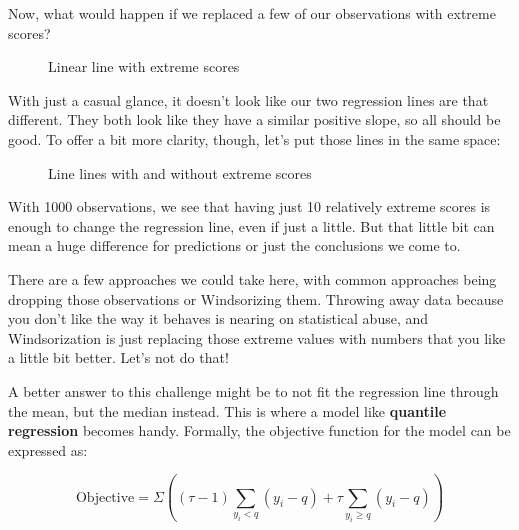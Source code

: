 \documentclass[
  letterpaper,
]{krantz}
\begin{document}
Now, what would happen if we replaced a few of our observations with
extreme scores?

\begin{figure}[H]


\caption{\label{fig-linear-line-extremes}Linear line with extreme
scores}

\end{figure}%

With just a casual glance, it doesn't look like our two regression lines
are that different. They both look like they have a similar positive
slope, so all should be good. To offer a bit more clarity, though, let's
put those lines in the same space:

\begin{figure}[H]


\caption{\label{fig-both-linear-lines}Line lines with and without
extreme scores}

\end{figure}%

With 1000 observations, we see that having just 10 relatively extreme
scores is enough to change the regression line, even if just a little.
But that little bit can mean a huge difference for predictions or just
the conclusions we come to.

There are a few approaches we could take here, with common approaches
being dropping those observations or Windsorizing them. Throwing away
data because you don't like the way it behaves is nearing on statistical
abuse, and Windsorization is just replacing those extreme values with
numbers that you like a little bit better. Let's not do that!

A better answer to this challenge might be to not fit the regression
line through the mean, but the median instead. This is where a model
like \textbf{quantile regression} becomes handy. Formally, the objective
function for the model can be expressed as:

\[
\text{Objective} =  \Sigma \left((\tau - 1)\sum_{y_{i}<q}(y_{i}-q)+\tau\sum_{y_{i}\geq q}(y_{i}-q) \right)
\]
\end{document}
